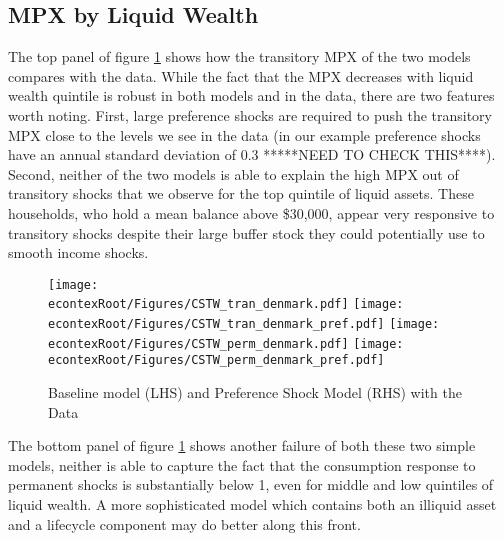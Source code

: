 \documentclass[titlepage]{\econtex}\newcommand{\texname}{ConsumptionHeterogeneity}
\begin{document}
\subsection{MPX by Liquid Wealth}
The top panel of figure \ref{fig:CSTW} shows how the transitory MPX of the two models compares with the data. While the fact that the MPX decreases with liquid wealth quintile is robust in both models and in the data, there are two features worth noting. First, large preference shocks are required to push the transitory MPX close to the levels we see in the data (in our example preference shocks have an annual standard deviation of 0.3 *****NEED TO CHECK THIS****). Second, neither of the two models is able to explain the high MPX out of transitory shocks that we observe for the top quintile of liquid assets. These households, who hold a mean balance above \$30,000, appear very responsive to transitory shocks despite their large buffer stock they could potentially use to smooth income shocks.
\begin{figure} 
	\begin{centering}
		\texttt{[image: \\econtexRoot/Figures/CSTW\_tran\_denmark.pdf]}
		\texttt{[image: \\econtexRoot/Figures/CSTW\_tran\_denmark\_pref.pdf]}
		\texttt{[image: \\econtexRoot/Figures/CSTW\_perm\_denmark.pdf]}
\texttt{[image: \\econtexRoot/Figures/CSTW\_perm\_denmark\_pref.pdf]}
		\caption{Baseline model (LHS) and Preference Shock Model (RHS) with the Data}
		\label{fig:CSTW}
	\end{centering}
\end{figure}

The bottom panel of figure \ref{fig:CSTW} shows another failure of both these two simple models, neither is able to capture the fact that the consumption response to permanent shocks is substantially below 1, even for middle and low quintiles of liquid wealth. A more sophisticated model which contains both an illiquid asset and a lifecycle component may do better along this front.
\end{document}
